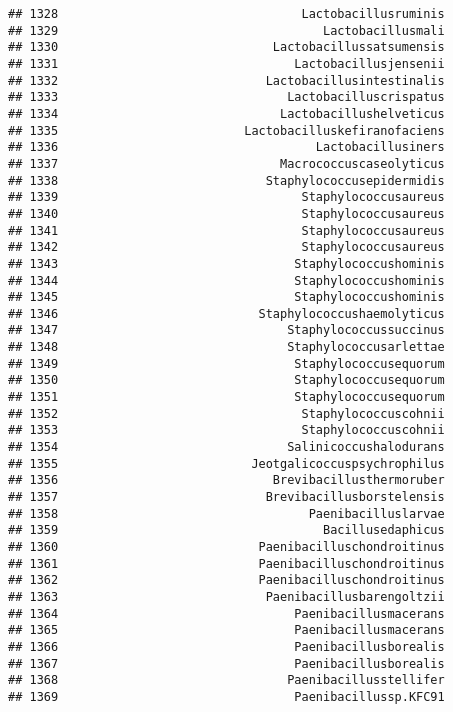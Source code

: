 \documentclass[
]{article}
\begin{document}
\begin{verbatim}
## 1328                                  Lactobacillusruminis
## 1329                                     Lactobacillusmali
## 1330                              Lactobacillussatsumensis
## 1331                                 Lactobacillusjensenii
## 1332                             Lactobacillusintestinalis
## 1333                                Lactobacilluscrispatus
## 1334                               Lactobacillushelveticus
## 1335                          Lactobacilluskefiranofaciens
## 1336                                    Lactobacillusiners
## 1337                               Macrococcuscaseolyticus
## 1338                             Staphylococcusepidermidis
## 1339                                  Staphylococcusaureus
## 1340                                  Staphylococcusaureus
## 1341                                  Staphylococcusaureus
## 1342                                  Staphylococcusaureus
## 1343                                 Staphylococcushominis
## 1344                                 Staphylococcushominis
## 1345                                 Staphylococcushominis
## 1346                            Staphylococcushaemolyticus
## 1347                                Staphylococcussuccinus
## 1348                                Staphylococcusarlettae
## 1349                                 Staphylococcusequorum
## 1350                                 Staphylococcusequorum
## 1351                                 Staphylococcusequorum
## 1352                                  Staphylococcuscohnii
## 1353                                  Staphylococcuscohnii
## 1354                                Salinicoccushalodurans
## 1355                           Jeotgalicoccuspsychrophilus
## 1356                              Brevibacillusthermoruber
## 1357                             Brevibacillusborstelensis
## 1358                                   Paenibacilluslarvae
## 1359                                     Bacillusedaphicus
## 1360                            Paenibacilluschondroitinus
## 1361                            Paenibacilluschondroitinus
## 1362                            Paenibacilluschondroitinus
## 1363                             Paenibacillusbarengoltzii
## 1364                                 Paenibacillusmacerans
## 1365                                 Paenibacillusmacerans
## 1366                                 Paenibacillusborealis
## 1367                                 Paenibacillusborealis
## 1368                                Paenibacillusstellifer
## 1369                                 Paenibacillussp.KFC91

\end{verbatim}
\end{document}
